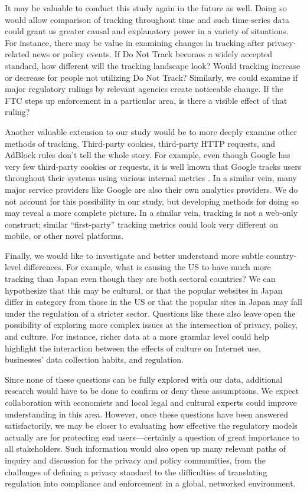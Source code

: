 \documentclass[conference]{IEEEtran}
\begin{document}
It may be valuable to conduct this study again in the future as well. Doing so would allow comparison of tracking throughout time and such time-series data could grant us greater causal and explanatory power in a variety of situations. For instance, there may be value in examining changes in tracking after privacy-related news or policy events. If Do Not Track becomes a widely accepted standard, how different will the tracking landscape look? Would tracking increase or decrease for people not utilizing Do Not Track? Similarly, we could examine if major regulatory rulings by relevant agencies create noticeable change. If the FTC steps up enforcement in a particular area, is there a visible effect of that ruling?

Another valuable extension to our study would be to more deeply examine other methods of tracking. Third-party cookies, third-party HTTP requests, and AdBlock rules don't tell the whole story. For example, even though Google has very few third-party cookies or requests, it is well known that Google tracks users throughout their systems using various internal metrics \cite{googlehist}. In a similar vein, many major service providers like Google are also their own analytics providers. We do not account for this possibility in our study, but developing methods for doing so may reveal a more complete picture. In a similar vein, tracking is not a web-only construct; similar ``first-party'' tracking metrics could look very different on mobile, or other novel platforms. 

Finally, we would like to investigate and better understand more subtle country-level differences. For example, what is causing the US to have much more tracking than Japan even though they are both sectoral countries? We can hypothesize that this may be cultural, or that the popular websites in Japan differ in category from those in the US or that the popular sites in Japan may fall under the regulation of a stricter sector. Questions like these also leave open the possibility of exploring more complex issues at the intersection of privacy, policy, and culture. For instance, richer data at a more granular level could help highlight the interaction between the effects of culture on Internet use, businesses' data collection habits, and regulation.

Since none of these questions can be fully explored with our data, additional research would have to be done to confirm or deny these assumptions. We expect collaboration with economists and local legal and cultural experts could improve understanding in this area. However, once these questions have been answered satisfactorily, we may be closer to evaluating how effective the regulatory models actually are for protecting end users---certainly a question of great importance to all stakeholders. Such information would also open up many relevant paths of inquiry and discussion for the privacy and policy communities, from the challenges of defining a privacy standard to the difficulties of translating regulation into compliance and enforcement in a global, networked environment. 
\end{document}
